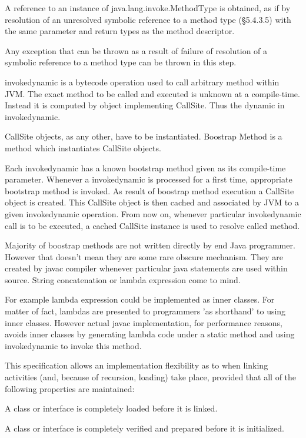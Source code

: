     A reference to an instance of java.lang.invoke.MethodType is obtained, as if by resolution of an unresolved symbolic reference to a method type (§5.4.3.5) with the same parameter and return types as the method descriptor.

    Any exception that can be thrown as a result of failure of resolution of a symbolic reference to a method type can be thrown in this step.


invokedynamic is a bytecode operation used to call arbitrary method within JVM. The exact method to be called and executed is unknown at a compile-time. Instead it is computed by object implementing CallSite. Thus the dynamic in invokedynamic.

CallSite objects, as any other, have to be instantiated. Boostrap Method is a method which instantiates CallSite objects.

Each invokedynamic has a known bootstrap method given as its compile-time parameter. Whenever a invokedynamic is processed for a first time, appropriate bootstrap method is invoked. As result of boostrap method execution a CallSite object is created. This CallSite object is then cached and associated by JVM to a given invokedynamic operation. From now on, whenever particular invokedynamic call is to be executed, a cached CallSite instance is used to resolve called method.

Majority of boostrap methods are not written directly by end Java programmer. However that doesn't mean they are some rare obscure mechanism. They are created by javac compiler whenever particular java statements are used within source. String concatenation or lambda expression come to mind.

For example lambda expression could be implemented as inner classes. For matter of fact, lambdas are presented to programmers 'as shorthand' to using inner classes. However actual javac implementation, for performance reasons, avoids inner classes by generating lambda code under a static method and using invokedynamic to invoke this method.


This specification allows an implementation flexibility as to when linking activities (and, because of recursion, loading) take place, provided that all of the following properties are maintained:

    A class or interface is completely loaded before it is linked.

    A class or interface is completely verified and prepared before it is initialized.


